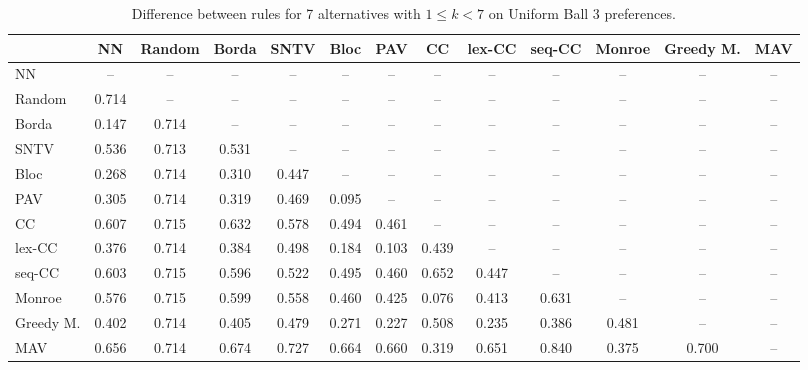 
\begin{table*}[htbp]
\centering
\begin{tabular}{lcccccccccccc}
\toprule
 & NN & Random & Borda & SNTV & Bloc & PAV & CC & lex-CC & seq-CC & Monroe & Greedy M. & MAV \\
\midrule
NN & -- & -- & -- & -- & -- & -- & -- & -- & -- & -- & -- & -- \\
Random & \cellcolor{blue!71} 0.714 & -- & -- & -- & -- & -- & -- & -- & -- & -- & -- & -- \\
Borda & \cellcolor{blue!14} 0.147 & \cellcolor{blue!71} 0.714 & -- & -- & -- & -- & -- & -- & -- & -- & -- & -- \\
SNTV & \cellcolor{blue!53} 0.536 & \cellcolor{blue!71} 0.713 & \cellcolor{blue!53} 0.531 & -- & -- & -- & -- & -- & -- & -- & -- & -- \\
Bloc & \cellcolor{blue!26} 0.268 & \cellcolor{blue!71} 0.714 & \cellcolor{blue!31} 0.310 & \cellcolor{blue!44} 0.447 & -- & -- & -- & -- & -- & -- & -- & -- \\
PAV & \cellcolor{blue!30} 0.305 & \cellcolor{blue!71} 0.714 & \cellcolor{blue!31} 0.319 & \cellcolor{blue!46} 0.469 & \cellcolor{blue!9} 0.095 & -- & -- & -- & -- & -- & -- & -- \\
CC & \cellcolor{blue!60} 0.607 & \cellcolor{blue!71} 0.715 & \cellcolor{blue!63} 0.632 & \cellcolor{blue!57} 0.578 & \cellcolor{blue!49} 0.494 & \cellcolor{blue!46} 0.461 & -- & -- & -- & -- & -- & -- \\
lex-CC & \cellcolor{blue!37} 0.376 & \cellcolor{blue!71} 0.714 & \cellcolor{blue!38} 0.384 & \cellcolor{blue!49} 0.498 & \cellcolor{blue!18} 0.184 & \cellcolor{blue!10} 0.103 & \cellcolor{blue!43} 0.439 & -- & -- & -- & -- & -- \\
seq-CC & \cellcolor{blue!60} 0.603 & \cellcolor{blue!71} 0.715 & \cellcolor{blue!59} 0.596 & \cellcolor{blue!52} 0.522 & \cellcolor{blue!49} 0.495 & \cellcolor{blue!46} 0.460 & \cellcolor{blue!65} 0.652 & \cellcolor{blue!44} 0.447 & -- & -- & -- & -- \\
Monroe & \cellcolor{blue!57} 0.576 & \cellcolor{blue!71} 0.715 & \cellcolor{blue!59} 0.599 & \cellcolor{blue!55} 0.558 & \cellcolor{blue!46} 0.460 & \cellcolor{blue!42} 0.425 & \cellcolor{blue!7} 0.076 & \cellcolor{blue!41} 0.413 & \cellcolor{blue!63} 0.631 & -- & -- & -- \\
Greedy M. & \cellcolor{blue!40} 0.402 & \cellcolor{blue!71} 0.714 & \cellcolor{blue!40} 0.405 & \cellcolor{blue!47} 0.479 & \cellcolor{blue!27} 0.271 & \cellcolor{blue!22} 0.227 & \cellcolor{blue!50} 0.508 & \cellcolor{blue!23} 0.235 & \cellcolor{blue!38} 0.386 & \cellcolor{blue!48} 0.481 & -- & -- \\
MAV & \cellcolor{blue!65} 0.656 & \cellcolor{blue!71} 0.714 & \cellcolor{blue!67} 0.674 & \cellcolor{blue!72} 0.727 & \cellcolor{blue!66} 0.664 & \cellcolor{blue!66} 0.660 & \cellcolor{blue!31} 0.319 & \cellcolor{blue!65} 0.651 & \cellcolor{blue!84} 0.840 & \cellcolor{blue!37} 0.375 & \cellcolor{blue!70} 0.700 & -- \\
\bottomrule
\end{tabular}

\caption{Difference between rules for 7 alternatives with $1 \leq k < 7$ on Uniform Ball 3 preferences.}
\label{tab:rule_distance_heatmap-m=[7]-pref_dist=euclidean__args__dimensions=3_-_space=uniform_ball}
\end{table*}
    